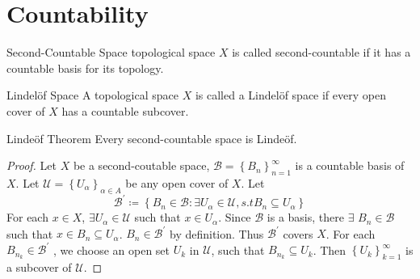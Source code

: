 \documentclass[../main.tex]{subfiles}
\begin{document}
\ifSubfilesClassLoaded{

    \tableofcontents
    
}{}

\chapter{ Countability }

\begin{definition}{Second-Countable Space}{}
     topological space $X$ is called second-countable if it has a countable basis for its topology. 
\end{definition}

\begin{definition}{Lindel\"of Space}{}
 A topological space $X$ is called a Lindelöf space if every open cover of $X$ has a countable subcover.
\end{definition}

\begin{theorem}{Linde\"of Theorem}{}
    Every second-countable space is Linde\"of.
\end{theorem}
\begin{proof}

    Let \(  X  \) be a second-coutable space, \(  \mathcal{B}= \left\{ B_{n} \right\}_{n = 1}^{\infty}  \) is a countable basis of \(  X  \). Let \(  \mathcal{U}= \left\{ U_{\alpha } \right\}_{\alpha \in A}  \) be any open cover of \(  X  \).     
  Let \[
  \mathcal{B}^{\prime} \coloneqq \left\{ B_{n}\in \mathcal{B}: \exists U_{\alpha }\in \mathcal{U}, s.t B_{n}\subseteq U_{\alpha } \right\}
  \] For each \(  x \in X  \),  \(  \exists U_{\alpha }\in \mathcal{U}  \) such that \(  x \in U_{\alpha }  \). Since \(  \mathcal{B}  \) is a basis, there \(  \exists   \) \(  B_{n}\in \mathcal{B}  \)       such that \(  x \in B_{n}\subseteq U_{\alpha }  \). \(  B_{n}\in \mathcal{B}^{\prime}   \) by definition. Thus \(  \mathcal{B}^{\prime}   \) covers \(  X  \). For each \(  B_{n_{k}}\in \mathcal{B}^{\prime}   \)     , we choose an open set \(  U_{k}  \) in \(  \mathcal{U}  \), such that \(  B_{n_{k}}\subseteq U_{k}  \). Then \(  \left\{ U_{k} \right\}_{k= 1}^{\infty}  \) is a subcover of \(  \mathcal{U}  \).     
\end{proof}
\end{document}
